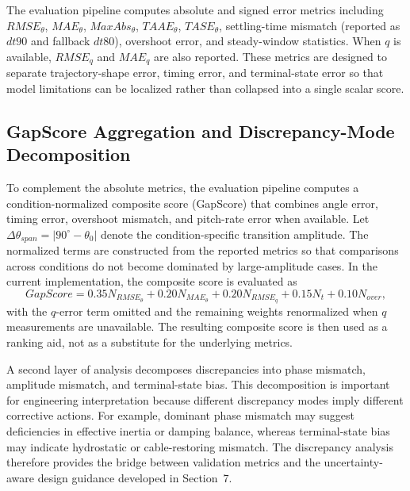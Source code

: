 
The evaluation pipeline computes absolute and signed error metrics including $RMSE_{\theta}$, $MAE_{\theta}$, $MaxAbs_{\theta}$, $TAAE_{\theta}$, $TASE_{\theta}$, settling-time mismatch (reported as $dt90$ and fallback $dt80$), overshoot error, and steady-window statistics. When $q$ is available, $RMSE_q$ and $MAE_q$ are also reported. These metrics are designed to separate trajectory-shape error, timing error, and terminal-state error so that model limitations can be localized rather than collapsed into a single scalar score.


\subsection{GapScore Aggregation and Discrepancy-Mode Decomposition}

To complement the absolute metrics, the evaluation pipeline computes a condition-normalized composite score (GapScore) that combines angle error, timing error, overshoot mismatch, and pitch-rate error when available. Let $\Delta\theta_{span}=|90^\circ-\theta_0|$ denote the condition-specific transition amplitude. The normalized terms are constructed from the reported metrics so that comparisons across conditions do not become dominated by large-amplitude cases. In the current implementation, the composite score is evaluated as
\[
GapScore = 0.35N_{RMSE_\theta} + 0.20N_{MAE_\theta} + 0.20N_{RMSE_q} + 0.15N_t + 0.10N_{over},
\]
with the $q$-error term omitted and the remaining weights renormalized when $q$ measurements are unavailable. The resulting composite score is then used as a ranking aid, not as a substitute for the underlying metrics.


A second layer of analysis decomposes discrepancies into phase mismatch, amplitude mismatch, and terminal-state bias. This decomposition is important for engineering interpretation because different discrepancy modes imply different corrective actions. For example, dominant phase mismatch may suggest deficiencies in effective inertia or damping balance, whereas terminal-state bias may indicate hydrostatic or cable-restoring mismatch. The discrepancy analysis therefore provides the bridge between validation metrics and the uncertainty-aware design guidance developed in Section~7.


